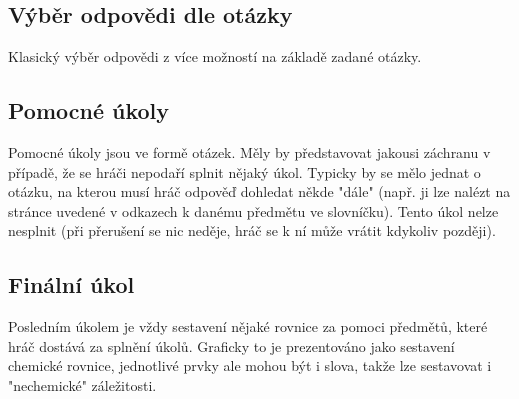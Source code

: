 \documentclass[a4paper,12pt]{article}
\begin{document}
\subsection{Výběr odpovědi dle otázky}
Klasický výběr odpovědi z více možností na základě zadané otázky.
\begin{figure}[H]
\end{figure}
\subsection{Pomocné úkoly}
Pomocné úkoly jsou ve formě otázek. Měly by představovat jakousi záchranu v případě, že se hráči nepodaří splnit nějaký úkol. Typicky by se mělo  jednat o otázku, na kterou musí hráč odpověď dohledat někde "dále" (např. ji lze nalézt na stránce uvedené v odkazech k danému předmětu ve slovníčku). Tento úkol nelze nesplnit (při přerušení se nic neděje, hráč se k ní může vrátit kdykoliv později).\subsection{Finální úkol}
Posledním úkolem je vždy sestavení nějaké rovnice za pomoci předmětů, které hráč dostává za splnění úkolů. Graficky to je prezentováno jako sestavení chemické rovnice, jednotlivé prvky ale mohou být i slova, takže lze sestavovat i "nechemické" záležitosti.
\begin{figure}[H]
\end{figure}
\newpage
\end{document}
